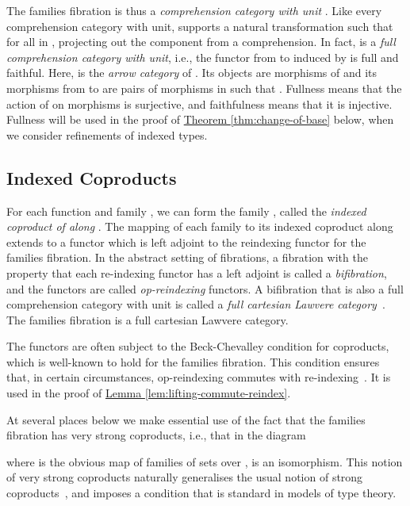 \documentclass{LMCS}
\newcommand{\lemref}[1]{\hyperref[#1]{Lemma \ref*{#1}}}
\newcommand{\thmref}[1]{\hyperref[#1]{Theorem \ref*{#1}}}
\begin{document}
The families fibration  is thus a \emph{comprehension category with
  unit} \cite{jacobs93comprehension,jacobs99book}. Like every
comprehension category with unit,  supports a natural
transformation  such that 
for all  in , projecting out the  component from
a comprehension. In fact,  is a {\em full comprehension category
with unit}, i.e., the functor from  to  induced
by  is full and faithful. Here,  is the {\em arrow
  category} of . Its objects are morphisms of  and its
morphisms from  to  are pairs  of morphisms in  such that . Fullness means that the action of  on
morphisms is surjective, and faithfulness means that it is injective.
Fullness will be used in the proof of \thmref{thm:change-of-base}
below, when we consider refinements of indexed types.

\subsection{Indexed Coproducts}\label{sec:sums}

For each function  and family , we can form the
family , called the {\em indexed coproduct of  along }.
The mapping of each family to its indexed coproduct along  extends
to a functor  which is left
adjoint to the reindexing functor  for the families fibration.
In the abstract setting of fibrations, a fibration with the property
that each re-indexing functor  has a left adjoint  is
called a \emph{bifibration}, and the functors  are called
{\em op-reindexing} functors. A bifibration that is also a full
comprehension category with unit is called a {\em full cartesian
  Lawvere category}~\cite{jacobs93comprehension}. The families
fibration is a full cartesian Lawvere category.

The functors  are often subject to the Beck-Chevalley
condition for coproducts, which is well-known to hold for the families
fibration. This condition ensures that, in certain circumstances,
op-reindexing commutes with re-indexing~\cite{jacobs99book}. It is
used in the proof of \lemref{lem:lifting-commute-reindex}.

At several places below we make essential use of the fact that the
families fibration has very strong coproducts, i.e., that in the diagram

\noindent
where  is the obvious map of families of sets over ,
 is an isomorphism. This notion of very strong coproducts
naturally generalises the usual notion of strong
coproducts~\cite{jacobs99book}, and imposes a condition that is
standard in models of type theory.
\end{document}
